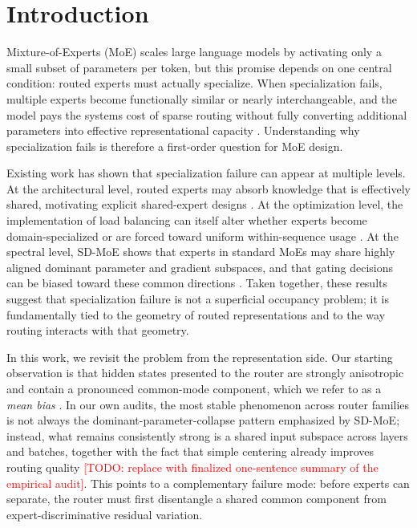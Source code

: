 \providecommand{\uncertain}[1]{\textcolor{red}{[TODO: #1]}}

\section{Introduction}
\label{sec:intro}

Mixture-of-Experts (MoE) scales large language models by activating only a small subset of parameters per token, but this promise depends on one central condition: routed experts must actually specialize. When specialization fails, multiple experts become functionally similar or nearly interchangeable, and the model pays the systems cost of sparse routing without fully converting additional parameters into effective representational capacity \citep{fedus2022switch,dai2024deepseekmoe,huang2026sdmoe}. Understanding why specialization fails is therefore a first-order question for MoE design.

Existing work has shown that specialization failure can appear at multiple levels. At the architectural level, routed experts may absorb knowledge that is effectively shared, motivating explicit shared-expert designs \citep{dai2024deepseekmoe}. At the optimization level, the implementation of load balancing can itself alter whether experts become domain-specialized or are forced toward uniform within-sequence usage \citep{qiu2025demons}. At the spectral level, SD-MoE shows that experts in standard MoEs may share highly aligned dominant parameter and gradient subspaces, and that gating decisions can be biased toward these common directions \citep{huang2026sdmoe}. Taken together, these results suggest that specialization failure is not a superficial occupancy problem; it is fundamentally tied to the geometry of routed representations and to the way routing interacts with that geometry.

In this work, we revisit the problem from the representation side. Our starting observation is that hidden states presented to the router are strongly anisotropic and contain a pronounced common-mode component, which we refer to as a \emph{mean bias} \citep{ethayarajh2019contextual,puccetti2022outlier}. In our own audits, the most stable phenomenon across router families is not always the dominant-parameter-collapse pattern emphasized by SD-MoE; instead, what remains consistently strong is a shared input subspace across layers and batches, together with the fact that simple centering already improves routing quality \uncertain{replace with finalized one-sentence summary of the empirical audit}. This points to a complementary failure mode: before experts can separate, the router must first disentangle a shared common component from expert-discriminative residual variation.

